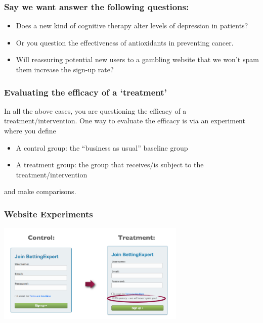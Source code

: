 \documentclass[slides]{beamer}
\newcommand{\blue}[1]{\textcolor{blue2}{#1}}
\begin{document}
\begin{frame}
\frametitle{Say we want answer the following questions:}
\begin{itemize}
\pause\item Does a new kind of cognitive therapy alter levels of depression in patients?
\pause\item Or you question the effectiveness of antioxidants in preventing cancer.
\pause\item Will reassuring potential new users to a gambling website that we won't spam them increase the sign-up rate?
\end{itemize}

\end{frame}



\begin{frame}
\frametitle{Evaluating the efficacy of a `treatment'}
In all the above cases, you are questioning the efficacy of a \blue{treatment/intervention}.  One way to evaluate the efficacy is via an \blue{experiment} where you define
\begin{itemize}
\pause\item A \blue{control} group: the ``business as usual'' baseline group
\pause\item A \blue{treatment} group:  the group that receives/is subject to the treatment/intervention
\end{itemize}
\pause and make comparisons.

\end{frame}



\begin{frame}
\frametitle{Website Experiments}
\begin{center}
\includegraphics[width=9cm]{figure/control_treatment.png}
\end{center}
\end{frame}
\end{document}
